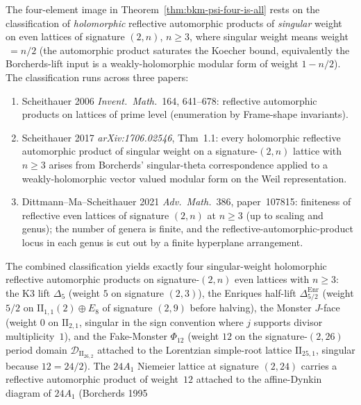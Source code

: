 \begin{remark}
\label{rem:bkm-scheithauer-primary-scope}
The four-element image in Theorem~\ref{thm:bkm-psi-four-is-all} rests
on the classification of \emph{holomorphic} reflective automorphic
products of \emph{singular} weight on even lattices of signature
$(2,n)$, $n\ge 3$, where singular weight means weight$~= n/2$ (the
automorphic product saturates the Koecher bound, equivalently the
Borcherds-lift input is a weakly-holomorphic modular form of weight
$1 - n/2$). The classification runs across three papers:
\begin{enumerate}[label=\textup{(\roman*)}]
\item Scheithauer 2006 \emph{Invent.\ Math.}~164, 641--678: reflective
automorphic products on lattices of prime level (enumeration by
Frame-shape invariants).
\item Scheithauer 2017 \emph{arXiv:1706.02546}, Thm~1.1: every
holomorphic reflective automorphic product of singular weight on a
signature-$(2,n)$ lattice with $n\ge 3$ arises from Borcherds'
singular-theta correspondence applied to a weakly-holomorphic vector
valued modular form on the Weil representation.
\item Dittmann--Ma--Scheithauer 2021 \emph{Adv.\ Math.}~386,
paper~107815: finiteness of reflective even lattices of signature
$(2,n)$ at $n\ge 3$ (up to scaling and genus); the number of genera
is finite, and the reflective-automorphic-product locus in each
genus is cut out by a finite hyperplane arrangement.
\end{enumerate}
The combined classification yields exactly four singular-weight
holomorphic reflective automorphic products on signature-$(2,n)$
even lattices with $n\ge 3$: the K3 lift $\Delta_5$ (weight $5$ on
signature $(2,3)$), the Enriques half-lift
$\Delta_{5/2}^{\mathrm{Enr}}$ (weight $5/2$ on
$\mathrm{II}_{1,1}(2)\oplus E_8$ of signature $(2,9)$ before
halving), the Monster $J$-face (weight $0$ on
$\mathrm{II}_{2,1}$, singular in the sign convention where $j$
supports divisor multiplicity~$1$), and the Fake-Monster
$\Phi_{12}$ (weight $12$ on the signature-$(2,26)$ period domain
$\mathcal{D}_{\mathrm{II}_{26,2}}$ attached to the Lorentzian
simple-root lattice $\mathrm{II}_{25,1}$, singular because
$12 = 24/2$). The $24A_1$ Niemeier lattice at signature $(2,24)$
carries a reflective automorphic product of weight~$12$ attached
to the affine-Dynkin diagram of $24A_1$ (Borcherds 1995

\end{remark}
